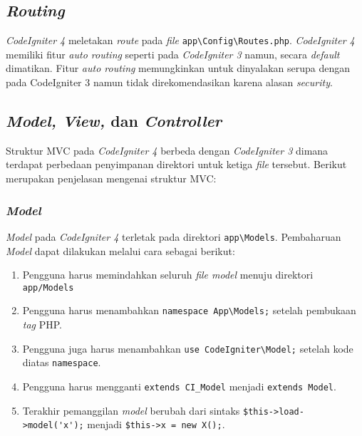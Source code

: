 \subsection{\textit{Routing}}

\textit{CodeIgniter 4} meletakan \textit{route} pada \textit{file} \verb|app\Config\Routes.php|. \textit{CodeIgniter 4} memiliki fitur \textit{auto routing} seperti pada \textit{CodeIgniter 3} namun, secara \textit{default} dimatikan. Fitur \textit{auto routing} memungkinkan untuk dinyalakan serupa dengan pada CodeIgniter 3 namun tidak direkomendasikan karena alasan \textit{security}.
 
\subsection{\textit{Model, View,} dan \textit{Controller}}
 
Struktur MVC pada \textit{CodeIgniter 4} berbeda dengan \textit{CodeIgniter 3} dimana terdapat perbedaan penyimpanan direktori untuk ketiga \textit{file} tersebut. Berikut merupakan penjelasan mengenai struktur MVC:

\subsubsection{\textit{Model}}
\textit{Model} pada \textit{CodeIgniter 4} terletak pada direktori \verb|app\Models|. Pembaharuan \textit{Model} dapat dilakukan melalui cara sebagai berikut:
\begin{enumerate}
\item Pengguna harus memindahkan seluruh \textit{file model} menuju direktori \verb|app/Models|
\item Pengguna harus menambahkan \verb|namespace App\Models;| setelah pembukaan \textit{tag} PHP.
\item Pengguna juga harus menambahkan \verb|use CodeIgniter\Model;| setelah kode diatas \texttt{namespace}.
\item Pengguna harus mengganti \verb|extends CI_Model| menjadi \verb|extends Model|.
\item Terakhir pemanggilan \textit{model} berubah dari sintaks \verb|$this->load->model('x');| menjadi \verb|$this->x = new X();|.
\end{enumerate}
 
